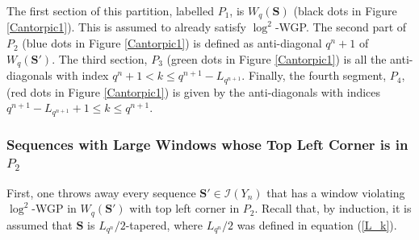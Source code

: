 \documentclass{article}
\theoremstyle{definition}
\numberwithin{equation}{subsection}
\begin{document}
\noindent The first section of this partition, labelled $P_1$, is $W_q(\mathbf{S})$ (black dots in Figure \ref{Cantorpic1}). This is assumed to already satisfy $\log^2$-WGP. The second part of $P_2$ (blue dots in Figure \ref{Cantorpic1}) is defined as anti-diagonal $q^n+1$ of $W_q(\mathbf{S}')$. The third section, $P_3$ (green dots in Figure \ref{Cantorpic1}) is all the anti-diagonals with index $q^n+1<k\le q^{n+1}-L_{q^{n+1}}$. Finally, the fourth segment, $P_4$, (red dots in Figure \ref{Cantorpic1}) is given by the anti-diagonals with indices $q^{n+1}-L_{q^{n+1}}+1\le k\le q^{n+1}$.

\subsubsection*{Sequences with Large Windows whose Top Left Corner is in $P_2$}

\noindent First, one throws away every sequence $\mathbf{S}'\in\mathcal{I}(Y_n)$ that has a window violating $\log^2$-WGP in $W_q(\mathbf{S}')$ with top left corner in $P_2$. Recall that, by induction, it is assumed that $\mathbf{S}$ is $L_{q^n}/2$-tapered, where $L_{q^n}/2$ was defined in equation (\ref{L_k}).\\
\end{document}
